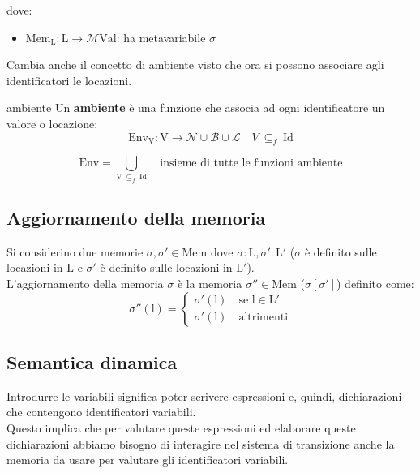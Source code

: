 dove:
\begin{itemize}[label=$\triangleright$, itemsep=\smallskipamount]
    \item $\mathrm{Mem_L : L} \to \mathcal{M}\mathrm{Val}$: ha metavariabile $\sigma$
\end{itemize}

Cambia anche il concetto di ambiente visto che ora si possono associare agli identificatori le locazioni.

\begin{mydef}{ambiente}
    Un \textbf{ambiente} è una funzione che associa ad ogni identificatore un valore o locazione:
    \[
        \mathrm{Env_V} : \mathrm{V} \to \mathcal{N} \cup \mathcal{B} \cup \mathcal{L} \quad V \ \subseteq_f \ \mathrm{Id}
    \]

    \smallskip
    \[
        \mathrm{Env} = \bigcup\limits_{\mathrm{V} \ \subseteq_f \ \mathrm{Id}} \quad \text{insieme di tutte le funzioni ambiente}
    \]
\end{mydef}

\subsection{Aggiornamento della memoria}
Si considerino due memorie $\sigma, \sigma' \in \mathrm{Mem}$ dove $\sigma : \mathrm{L}, \sigma' : \mathrm{L}'$ ($\sigma$ è definito sulle locazioni in $\mathrm{L}$ e $\sigma'$ è definito sulle locazioni in $\mathrm{L}'$).\\[0.2ex]
L'aggiornamento della memoria $\sigma$ è la memoria $\sigma'' \in \mathrm{Mem}$ ($\sigma[\sigma']$) definito come:
\[
    \sigma''(\mathrm{l}) =
    \begin{cases}
        \sigma'(\mathrm{l}) \quad \text{se } \mathrm{l \in L'}\\
        \sigma'(\mathrm{l}) \quad \text{altrimenti}
    \end{cases}
\]

\subsection{Semantica dinamica}
Introdurre le variabili significa poter scrivere espressioni e, quindi, dichiarazioni che contengono identificatori variabili.\\[0.2ex]
Questo implica che per valutare queste espressioni ed elaborare queste dichiarazioni abbiamo bisogno di interagire nel sistema di transizione anche la memoria da usare per valutare gli identificatori variabili.

